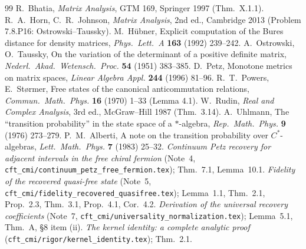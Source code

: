 \documentclass[11pt]{article}
\theoremstyle{definition}\newtheorem{problem}[theorem]{Problem}
\begin{document}
\begin{thebibliography}{99}\footnotesize
{} R.~Bhatia, \emph{Matrix Analysis}, GTM 169, Springer 1997 (Thm.~X.1.1).
 R.~A.~Horn, C.~R.~Johnson, \emph{Matrix Analysis}, 2nd ed., Cambridge 2013
 (Problem 7.8.P16: Ostrowski--Taussky).
 M.~H\"ubner, Explicit computation of the Bures distance for density matrices,
 \emph{Phys.\ Lett.\ A} \textbf{163} (1992) 239--242.
 A.~Ostrowski, O.~Taussky, On the variation of the determinant of a positive definite
 matrix, \emph{Nederl.\ Akad.\ Wetensch.\ Proc.} \textbf{54} (1951) 383--385.
 D.~Petz, Monotone metrics on matrix spaces, \emph{Linear Algebra Appl.}
 \textbf{244} (1996) 81--96.
 R.~T.~Powers, E.~St\o rmer, Free states of the canonical anticommutation relations,
 \emph{Commun.\ Math.\ Phys.} \textbf{16} (1970) 1--33 (Lemma 4.1).
 W.~Rudin, \emph{Real and Complex Analysis}, 3rd ed., McGraw--Hill 1987 (Thm.~3.14).
 A.~Uhlmann, The ``transition probability'' in the state space of a
 \(*\)-algebra, \emph{Rep.\ Math.\ Phys.} \textbf{9} (1976) 273--279.
 P.~M.~Alberti, A note on the transition probability over \(C^*\)-algebras,
 \emph{Lett.\ Math.\ Phys.} \textbf{7} (1983) 25--32.
 \emph{Continuum Petz recovery for adjacent intervals in the free chiral fermion}
 (Note~4, \texttt{cft\_cmi/continuum\_petz\_free\_fermion.tex}); Thm.~7.1, Lemma~10.1.
 \emph{Fidelity of the recovered quasi-free state} (Note~5,
 \texttt{cft\_cmi/fidelity\_recovered\_quasifree.tex}); Lemma~1.1, Thm.~2.1, Prop.~2.3, Thm.~3.1,
 Prop.~4.1, Cor.~4.2.
 \emph{Derivation of the universal recovery coefficients} (Note~7,
 \texttt{cft\_cmi/universality\_normalization.tex}); Lemma~5.1, Thm.~A, \S8 item (ii).
 \emph{The kernel identity: a complete analytic proof}
 (\texttt{cft\_cmi/rigor/kernel\_identity.tex}); Thm.~2.1.
\end{thebibliography}
\end{document}
